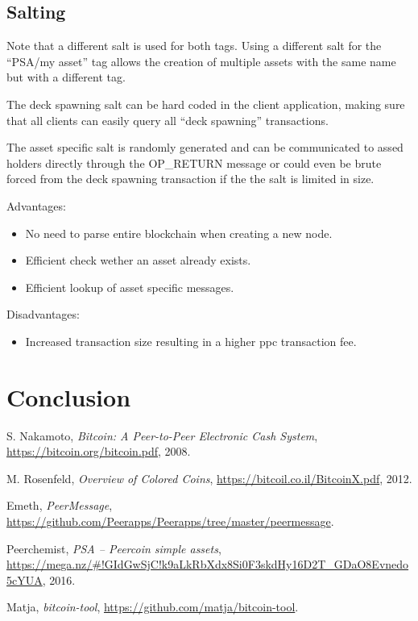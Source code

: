 \documentclass[a4paper,10pt]{article}
\begin{document}
\subsection{Salting}
Note that a different salt is used for both tags.
Using a different salt for the ``PSA/my asset'' tag allows the creation of multiple assets with the same name but with a different tag.

The deck spawning salt can be hard coded in the client application, making sure that all clients can easily query all ``deck spawning'' transactions.

The asset specific salt is randomly generated and can be communicated to assed holders directly through the OP\_RETURN message or could even be brute forced from the deck spawning transaction if the the salt is limited in size.



Advantages:
\begin{itemize}
 \item No need to parse entire blockchain when creating a new node.
 \item Efficient check wether an asset already exists.
 \item Efficient lookup of asset specific messages.
\end{itemize}

Disadvantages:
\begin{itemize}
 \item Increased transaction size resulting in a higher ppc transaction fee.
\end{itemize}

\section{Conclusion}


\begin{thebibliography}{9}

  S. Nakamoto,
  \emph{Bitcoin: A Peer-to-Peer Electronic Cash System},
  \url{https://bitcoin.org/bitcoin.pdf},
  2008.

  M. Rosenfeld,
  \emph{Overview of Colored Coins},
  \url{https://bitcoil.co.il/BitcoinX.pdf},
  2012.

  Emeth,
  \emph{PeerMessage},
  \url{https://github.com/Peerapps/Peerapps/tree/master/peermessage}.

  Peerchemist,
  \emph{PSA – Peercoin simple assets},
  \url{https://mega.nz/#!GIdGwSjC!k9aLkRbXdx8Si0F3skdHy16D2T_GDaO8Evnedo5cYUA},
  2016.

  Matja,
  \emph{bitcoin-tool},
  \url{https://github.com/matja/bitcoin-tool}.

\end{thebibliography}
\end{document}
